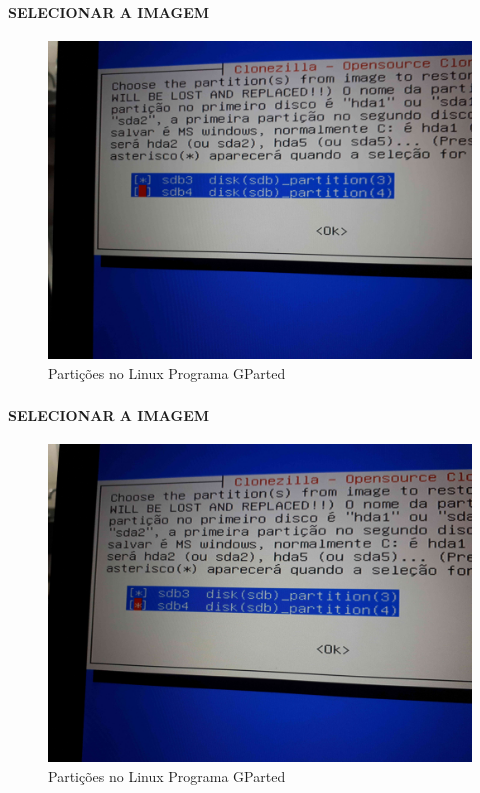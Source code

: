 \documentclass{beamer}
\begin{document}
\begin{frame}[plain,c]
   \frametitle{\insertsection}
    \framesubtitle{SELECIONAR A IMAGEM}
    \begin{figure}[!h]
        \includegraphics[width=1\linewidth]{images/rest/res10.jpg}
        \caption{Partições no Linux Programa GParted}
    \end{figure}
\end{frame}	


\begin{frame}[plain,c]
   \frametitle{\insertsection}
    \framesubtitle{SELECIONAR A IMAGEM}
    \begin{figure}[!h]
        \includegraphics[width=1\linewidth]{images/rest/res11.jpg}
        \caption{Partições no Linux Programa GParted}
    \end{figure}
\end{frame}
\end{document}
